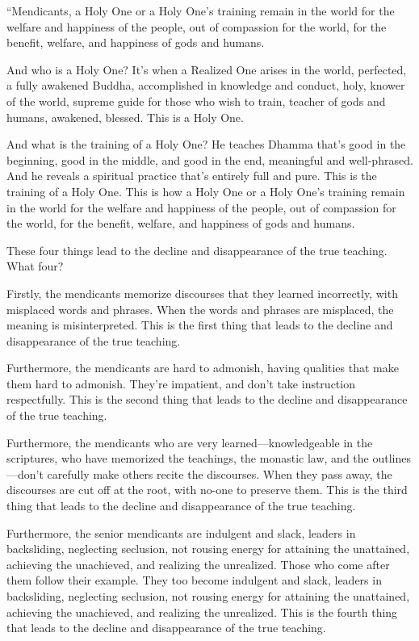 \documentclass[12pt,openany]{book}%
\begin{document}
“Mendicants, a Holy One or a Holy One’s training remain in the world for the welfare and happiness of the people, out of compassion for the world, for the benefit, welfare, and happiness of gods and humans. 

And who is a Holy One? It’s when a Realized One arises in the world, perfected, a fully awakened Buddha, accomplished in knowledge and conduct, holy, knower of the world, supreme guide for those who wish to train, teacher of gods and humans, awakened, blessed. This is a Holy One. 

And what is the training of a Holy One? He teaches Dhamma that’s good in the beginning, good in the middle, and good in the end, meaningful and well-phrased. And he reveals a spiritual practice that’s entirely full and pure. This is the training of a Holy One. This is how a Holy One or a Holy One’s training remain in the world for the welfare and happiness of the people, out of compassion for the world, for the benefit, welfare, and happiness of gods and humans. 

These four things lead to the decline and disappearance of the true teaching. What four? 

Firstly, the mendicants memorize discourses that they learned incorrectly, with misplaced words and phrases. When the words and phrases are misplaced, the meaning is misinterpreted. This is the first thing that leads to the decline and disappearance of the true teaching. 

Furthermore, the mendicants are hard to admonish, having qualities that make them hard to admonish. They’re impatient, and don’t take instruction respectfully. This is the second thing that leads to the decline and disappearance of the true teaching. 

Furthermore, the mendicants who are very learned—knowledgeable in the scriptures, who have memorized the teachings, the monastic law, and the outlines—don’t carefully make others recite the discourses. When they pass away, the discourses are cut off at the root, with no-one to preserve them. This is the third thing that leads to the decline and disappearance of the true teaching. 

Furthermore, the senior mendicants are indulgent and slack, leaders in backsliding, neglecting seclusion, not rousing energy for attaining the unattained, achieving the unachieved, and realizing the unrealized. Those who come after them follow their example. They too become indulgent and slack, leaders in backsliding, neglecting seclusion, not rousing energy for attaining the unattained, achieving the unachieved, and realizing the unrealized. This is the fourth thing that leads to the decline and disappearance of the true teaching. 
\end{document}
